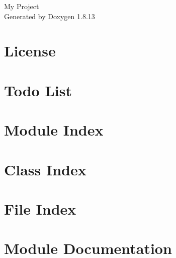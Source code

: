 \documentclass[twoside]{book}
\newcommand{\+}{\discretionary{\mbox{\scriptsize$\hookleftarrow$}}{}{}}
\newcommand{\clearemptydoublepage}{%
  \newpage{\pagestyle{empty}\cleardoublepage}%
}
\begin{document}
\hypersetup{pageanchor=false,
             bookmarksnumbered=true,
             pdfencoding=unicode
            }
\begin{titlepage}
\vspace*{7cm}
\begin{center}%
{\Large My Project }\\
\vspace*{1cm}
{\large Generated by Doxygen 1.8.13}\\
\end{center}
\end{titlepage}
\clearemptydoublepage
{}
\tableofcontents
\clearemptydoublepage
{}
\hypersetup{pageanchor=true}

\chapter{License}
\label{_license}

\chapter{Todo List}
\label{todo}

\chapter{Module Index}

\chapter{Class Index}

\chapter{File Index}

\chapter{Module Documentation}




















\end{document}
